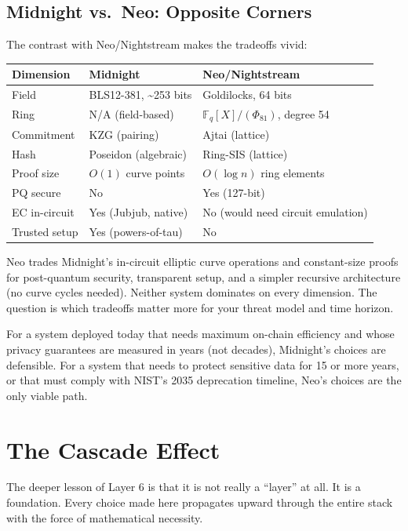 \documentclass[
  11pt,
  openany]{report}
\begin{document}
\subsection{Midnight vs.~Neo: Opposite
Corners}\label{midnight-vs.-neo-opposite-corners}

The contrast with Neo/Nightstream makes the tradeoffs vivid:

\begin{longtable}[]{@{}lll@{}}
\toprule\noalign{}
Dimension & Midnight & Neo/Nightstream \\
\midrule\noalign{}
\arrayrulecolor{MidnightBlue}\midrule\arrayrulecolor{MidnightBorder}
\endhead
\bottomrule\noalign{}
\endlastfoot
Field & BLS12-381, \textasciitilde253 bits & Goldilocks, 64 bits \\
Ring & N/A (field-based) & \(\mathbb{F}_q[X]/(\Phi_{81})\), degree 54 \\
Commitment & KZG (pairing) & Ajtai (lattice) \\
Hash & Poseidon (algebraic) & Ring-SIS (lattice) \\
Proof size & \(O(1)\) curve points & \(O(\log n)\) ring elements \\
PQ secure & No & Yes (127-bit) \\
EC in-circuit & Yes (Jubjub, native) & No (would need circuit emulation) \\
Trusted setup & Yes (powers-of-tau) & No \\
\end{longtable}

Neo trades Midnight's in-circuit elliptic curve operations and constant-size
proofs for post-quantum security, transparent setup, and a simpler recursive
architecture (no curve cycles needed). Neither system dominates on every
dimension. The question is which tradeoffs matter more for your threat model and
time horizon.

For a system deployed today that needs maximum on-chain efficiency and whose
privacy guarantees are measured in years (not decades), Midnight's choices are
defensible. For a system that needs to protect sensitive data for 15 or more
years, or that must comply with NIST's 2035 deprecation timeline, Neo's choices
are the only viable path.

\section{The Cascade Effect}\label{the-cascade-effect}

The deeper lesson of Layer 6 is that it is not really a ``layer'' at all. It is
a foundation. Every choice made here propagates upward through the entire stack
with the force of mathematical necessity.
\end{document}
